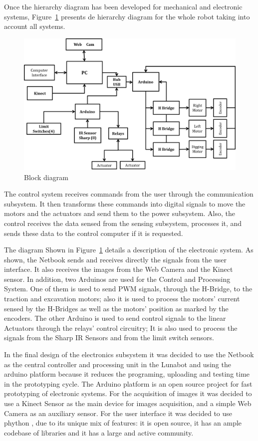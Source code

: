 \documentclass[conference]{IEEEtran}
\begin{document}
Once the hierarchy diagram has been developed for mechanical and electronic systems, Figure~\ref{fg: fig20} presents de hierarchy diagram for the whole robot taking into account all systems.

 \begin{figure}[!htb] 
 \centering
\includegraphics [width=0.8\linewidth]{img/Figure20e}
 \caption{Block diagram} 
 \label{fg: fig20}
 \end{figure}

The control system receives commands from the user through the communication subsystem. It then transforms these commands into digital signals to move the motors and the actuators and send them to the power subsystem. Also, the control receives the data sensed from the sensing subsystem, processes it, and sends these data to the control computer if it is requested.

The diagram Shown in  Figure~\ref{fg: fig20} details a description of the electronic system.  As shown, the Netbook sends and receives directly the signals from the user interface. It also receives the images from the Web Camera and the Kinect sensor. In addition, two Arduinos are used for the Control and Processing System. One of them is used to send PWM signals, through the H-Bridge, to the traction and excavation motors; also it is used to process the motors’ current sensed by the H-Bridges as well as the motors’ position as marked by the encoders. The other Arduino is used to send control signals to the linear Actuators through the relays’ control circuitry; It is also used to process the signals from the Sharp IR Sensors and from the limit switch sensors. 

In the final design of the electronics subsystem it was decided to use the Netbook as the central controller and processing unit in the Lunabot and using the arduino platform because it reduces the programing, uploading and testing time in the prototyping cycle. The Arduino platform is an open source project for fast prototyping of electronic systems. 
For the acquisition of images it was decided to use a Kinect Sensor as the main device for images acquisition, and a simple Web Camera as an auxiliary sensor.
For the user interface it was decided to use phython , due to its unique mix of features: it is open source, it has an ample codebase of libraries and it has a large and active community.
\end{document}
